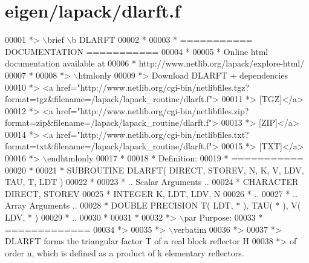\hypertarget{eigen_2lapack_2dlarft_8f_source}{}\section{eigen/lapack/dlarft.f}
\label{eigen_2lapack_2dlarft_8f_source}

\begin{DoxyCode}
00001 \textcolor{comment}{*> \(\backslash\)brief \(\backslash\)b DLARFT}
00002 \textcolor{comment}{*}
00003 \textcolor{comment}{*  =========== DOCUMENTATION ===========}
00004 \textcolor{comment}{*}
00005 \textcolor{comment}{* Online html documentation available at }
00006 \textcolor{comment}{*            http://www.netlib.org/lapack/explore-html/ }
00007 \textcolor{comment}{*}
00008 \textcolor{comment}{*> \(\backslash\)htmlonly}
00009 \textcolor{comment}{*> Download DLARFT + dependencies }
00010 \textcolor{comment}{*> <a
       href="http://www.netlib.org/cgi-bin/netlibfiles.tgz?format=tgz&filename=/lapack/lapack\_routine/dlarft.f"> }
00011 \textcolor{comment}{*> [TGZ]</a> }
00012 \textcolor{comment}{*> <a
       href="http://www.netlib.org/cgi-bin/netlibfiles.zip?format=zip&filename=/lapack/lapack\_routine/dlarft.f"> }
00013 \textcolor{comment}{*> [ZIP]</a> }
00014 \textcolor{comment}{*> <a
       href="http://www.netlib.org/cgi-bin/netlibfiles.txt?format=txt&filename=/lapack/lapack\_routine/dlarft.f"> }
00015 \textcolor{comment}{*> [TXT]</a>}
00016 \textcolor{comment}{*> \(\backslash\)endhtmlonly }
00017 \textcolor{comment}{*}
00018 \textcolor{comment}{*  Definition:}
00019 \textcolor{comment}{*  ===========}
00020 \textcolor{comment}{*}
00021 \textcolor{comment}{*       SUBROUTINE DLARFT( DIRECT, STOREV, N, K, V, LDV, TAU, T, LDT )}
00022 \textcolor{comment}{* }
00023 \textcolor{comment}{*       .. Scalar Arguments ..}
00024 \textcolor{comment}{*       CHARACTER          DIRECT, STOREV}
00025 \textcolor{comment}{*       INTEGER            K, LDT, LDV, N}
00026 \textcolor{comment}{*       ..}
00027 \textcolor{comment}{*       .. Array Arguments ..}
00028 \textcolor{comment}{*       DOUBLE PRECISION   T( LDT, * ), TAU( * ), V( LDV, * )}
00029 \textcolor{comment}{*       ..}
00030 \textcolor{comment}{*  }
00031 \textcolor{comment}{*}
00032 \textcolor{comment}{*> \(\backslash\)par Purpose:}
00033 \textcolor{comment}{*  =============}
00034 \textcolor{comment}{*>}
00035 \textcolor{comment}{*> \(\backslash\)verbatim}
00036 \textcolor{comment}{*>}
00037 \textcolor{comment}{*> DLARFT forms the triangular factor T of a real block reflector H}
00038 \textcolor{comment}{*> of order n, which is defined as a product of k elementary reflectors.}

\end{DoxyCode}
